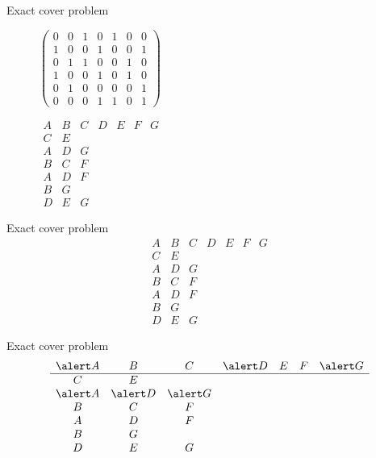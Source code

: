\documentclass{beamer}
\begin{document}
%
\begin{frame}{Exact cover problem}
  \centering
  \begin{figure}[!htb]
    \begin{minipage}{.6\textwidth}
      \centering
      $\left(\begin{array}{ccccccc}
    0&0&1&0&1&0&0\\
    1&0&0&1&0&0&1\\
    0&1&1&0&0&1&0\\
    1&0&0&1&0&1&0\\
    0&1&0&0&0&0&1\\
    0&0&0&1&1&0&1
  \end{array}\right)$
    \end{minipage}%
    \begin{minipage}{.4\textwidth}
      \centering
  $
  \begin{array}{ccccccc}
    A & B & C & D & E & F & G\\
    \hline
    C & E &&&&&\\
    A & D & G &&&&\\
    B & C & F &&&&\\
    A & D & F &&&&\\
    B & G &&&&&\\
    D & E & G &&&&
  \end{array}
  $
    \end{minipage}
\end{figure}
\end{frame}

\renewcommand\arraystretch{1.3}
%
\begin{frame}{Exact cover problem} 
  $$
  \begin{array}{ccccccc}
    A & B & C & D & E & F & G\\
    \hline
    C & E &&&&&\\
    A & D & G &&&&\\
    B & C & F &&&&\\
    A & D & F &&&&\\
    B & G &&&&&\\
    D & E & G &&&&
  \end{array}
  $$
\end{frame}

%
\begin{frame}{Exact cover problem} 
  $$
  \begin{array}{ccccccc}
    \alert A & B & C & \alert D & E & F & \alert G\\
    \hline
    C & E &&&&&\\
    \alert A & \alert D & \alert G &&&&\\
    B & C & F &&&&\\
    A & D & F &&&&\\
    B & G &&&&&\\
    D & E & G &&&&
  \end{array}
  $$
\end{frame}
\end{document}
